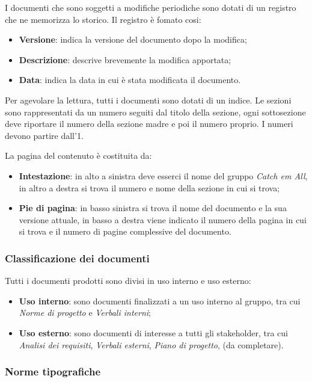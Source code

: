 I documenti che sono soggetti a modifiche periodiche sono dotati di un registro che ne memorizza lo storico. Il registro è fomato cosi:
\begin{itemize}
    \item \textbf{Versione}: indica la versione del documento dopo la modifica;
    \item \textbf{Descrizione}: descrive brevemente la modifica apportata;
    \item \textbf{Data}: indica la data in cui è stata modificata il documento.
\end{itemize}

Per agevolare la lettura, tutti i documenti sono dotati di un indice. Le sezioni sono rappresentati da un numero seguiti dal titolo della sezione, ogni sottosezione deve riportare il numero della sezione madre e poi il numero proprio. I numeri devono partire dall'1.

La pagina del contenuto è costituita da:
\begin{itemize}
    \item \textbf{Intestazione}: in alto a sinistra deve esserci il nome del gruppo \textit{Catch em All}, in altro a destra si trova il numero e nome della sezione in cui si trova;
    \item \textbf{Pie di pagina}: in basso sinistra si trova il nome del documento e la sua versione attuale, in basso a destra viene indicato il numero della pagina in cui si trova e il numero di pagine complessive del documento.
\end{itemize}

\subsubsection{Classificazione dei documenti}
Tutti i documenti prodotti sono divisi in uso interno e uso esterno:
\begin{itemize}
    \item \textbf{Uso interno}: sono documenti finalizzati a un uso interno al gruppo, tra cui \textit{Norme di progetto} e \textit{Verbali interni};
    \item \textbf{Uso esterno}: sono documenti di interesse a tutti gli stakeholder, tra cui \textit{Analisi dei requisiti}, \textit{Verbali esterni}, \textit{Piano di progetto}, (da completare).
\end{itemize}

\subsubsection{Norme tipografiche}

